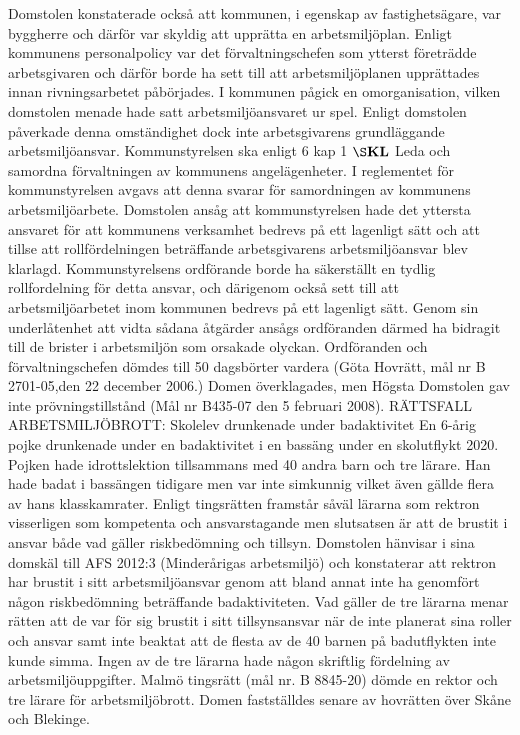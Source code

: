 Domstolen konstaterade också att kommunen, i egenskap av fastighetsägare, var byggherre och därför var skyldig att upprätta en arbetsmiljöplan. Enligt kommunens personalpolicy var det förvaltningschefen som ytterst företrädde arbetsgivaren och därför borde ha sett till att arbetsmiljöplanen upprättades innan rivningsarbetet påbörjades. I kommunen pågick en omorganisation, vilken domstolen menade hade satt arbetsmiljöansvaret ur spel. Enligt domstolen påverkade denna omständighet dock inte arbetsgivarens grundläggande arbetsmiljöansvar. Kommunstyrelsen ska enligt 6 kap 1 \(\S \mathbf{K L}\) Leda och samordna förvaltningen av kommunens angelägenheter. I reglementet för kommunstyrelsen avgavs att denna svarar för samordningen av kommunens arbetsmiljöarbete. Domstolen ansåg att kommunstyrelsen hade det yttersta ansvaret för att kommunens verksamhet bedrevs på ett lagenligt sätt och att tillse att rollfördelningen beträffande arbetsgivarens arbetsmiljöansvar blev klarlagd. Kommunstyrelsens ordförande borde ha säkerställt en tydlig rollfordelning för detta ansvar, och därigenom också sett till att arbetsmiljöarbetet inom kommunen bedrevs på ett lagenligt sätt. Genom sin underlåtenhet att vidta sådana åtgärder ansågs ordföranden därmed ha bidragit till de brister i arbetsmiljön som orsakade olyckan. Ordföranden och förvaltningschefen dömdes till 50 dagsbörter vardera (Göta Hovrätt, mål nr B 2701-05,den 22 december 2006.)
Domen överklagades, men Högsta Domstolen gav inte prövningstillstånd (Mål nr B435-07 den 5 februari 2008).
RÄTTSFALL ARBETSMILJÖBROTT: Skolelev drunkenade under badaktivitet En 6-årig pojke drunkenade under en badaktivitet i en bassäng under en skolutflykt 2020. Pojken hade idrottslektion tillsammans med 40 andra barn och tre lärare. Han hade badat i bassängen tidigare men var inte simkunnig vilket även gällde flera av hans klasskamrater.
Enligt tingsrätten framstår såväl lärarna som rektron visserligen som kompetenta och ansvarstagande men slutsatsen är att de brustit i ansvar både vad gäller riskbedömning och tillsyn.
Domstolen hänvisar i sina domskäl till AFS 2012:3 (Minderårigas arbetsmiljö) och konstaterar att rektron har brustit i sitt arbetsmiljöansvar genom att bland annat inte ha genomfört någon riskbedömning beträffande badaktiviteten. Vad gäller de tre lärarna menar rätten att de var för sig brustit i sitt tillsynsansvar när de inte planerat sina roller och ansvar samt inte beaktat att de flesta av de 40 barnen på badutflykten inte kunde simma. Ingen av de tre lärarna hade någon skriftlig fördelning av arbetsmiljöuppgifter.
Malmö tingsrätt (mål nr. B 8845-20) dömde en rektor och tre lärare för arbetsmiljöbrott. Domen fastställdes senare av hovrätten över Skåne och Blekinge.

